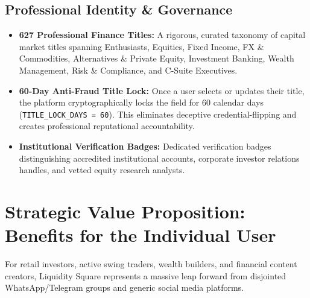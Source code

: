 \documentclass[11pt,a4paper]{article}
\begin{document}
\subsection{Professional Identity \& Governance}
\begin{itemize}
    \item \textbf{627 Professional Finance Titles:} A rigorous, curated taxonomy of capital market titles spanning Enthusiasts, Equities, Fixed Income, FX \& Commodities, Alternatives \& Private Equity, Investment Banking, Wealth Management, Risk \& Compliance, and C-Suite Executives.
    \item \textbf{60-Day Anti-Fraud Title Lock:} Once a user selects or updates their title, the platform cryptographically locks the field for 60 calendar days (\texttt{TITLE\_LOCK\_DAYS = 60}). This eliminates deceptive credential-flipping and creates professional reputational accountability.
    \item \textbf{Institutional Verification Badges:} Dedicated verification badges distinguishing accredited institutional accounts, corporate investor relations handles, and vetted equity research analysts.
\end{itemize}

\section{Strategic Value Proposition: Benefits for the Individual User}

For retail investors, active swing traders, wealth builders, and financial content creators, Liquidity Square represents a massive leap forward from disjointed WhatsApp/Telegram groups and generic social media platforms.
\end{document}

